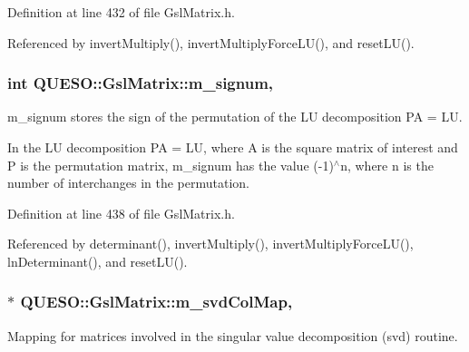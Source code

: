Definition at line 432 of file Gsl\-Matrix.\-h.



Referenced by invert\-Multiply(), invert\-Multiply\-Force\-L\-U(), and reset\-L\-U().

\hypertarget{class_q_u_e_s_o_1_1_gsl_matrix_a591c6afd472ae02dd79e3a109ded4d51}{
\subsubsection[{m\-\_\-signum}]{\setlength{\rightskip}{0pt plus 5cm}int Q\-U\-E\-S\-O\-::\-Gsl\-Matrix\-::m\-\_\-signum\hspace{0.3cm}{\ttfamily [mutable]}, {\ttfamily [private]}}}\label{class_q_u_e_s_o_1_1_gsl_matrix_a591c6afd472ae02dd79e3a109ded4d51}


m\-\_\-signum stores the sign of the permutation of the L\-U decomposition P\-A = L\-U. 

In the L\-U decomposition P\-A = L\-U, where A is the square matrix of interest and P is the permutation matrix, m\-\_\-signum has the value (-\/1)$^\wedge$n, where n is the number of interchanges in the permutation. 

Definition at line 438 of file Gsl\-Matrix.\-h.



Referenced by determinant(), invert\-Multiply(), invert\-Multiply\-Force\-L\-U(), ln\-Determinant(), and reset\-L\-U().

\hypertarget{class_q_u_e_s_o_1_1_gsl_matrix_a0457658d209ab7ac93fd82171e96afa9}{
\subsubsection[{m\-\_\-svd\-Col\-Map}]{$\ast$ Q\-U\-E\-S\-O\-::\-Gsl\-Matrix\-::m\-\_\-svd\-Col\-Map\hspace{0.3cm}{\ttfamily [mutable]}, {\ttfamily [private]}}}\label{class_q_u_e_s_o_1_1_gsl_matrix_a0457658d209ab7ac93fd82171e96afa9}


Mapping for matrices involved in the singular value decomposition (svd) routine. 



